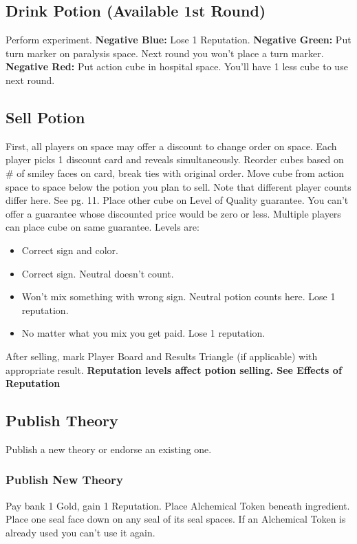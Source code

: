 \documentclass[12pt]{article}
\newenvironment{itemizeCustom}
{\begin{itemize}
  \setlength{\itemsep}{1pt}
  \setlength{\parskip}{0pt}
  \setlength{\parsep}{0pt}}
{\end{itemize}}
\begin{document}
\begin{multicols*}{2}
\subsection*{Drink Potion (Available 1st Round)}
Perform experiment. \textbf{Negative Blue:} Lose 1 Reputation. \textbf{Negative Green:} Put turn marker on paralysis space. Next round you won't place a turn marker. \textbf{Negative Red:} Put action cube in hospital space. You'll have 1 less cube to use next round.

\subsection*{Sell Potion}
First, all players on space may offer a discount to change order on space. Each player picks 1 discount card and reveals simultaneously. Reorder cubes based on \# of smiley faces on card, break ties with original order. Move cube from action space to space below the potion you plan to sell. Note that different player counts differ here. See pg. 11. Place other cube on Level of Quality guarantee. You can't offer a guarantee whose discounted price would be zero or less. Multiple players can place cube on same guarantee. Levels are:

\begin{itemizeCustom}
    \item Correct sign and color.
    \item Correct sign. Neutral doesn't count.
    \item Won't mix something with wrong sign. Neutral potion counts here. Lose 1 reputation.
    \item No matter what you mix you get paid. Lose 1 reputation.

\end{itemizeCustom}

After selling, mark Player Board and Results Triangle (if applicable) with appropriate result. \textbf{Reputation levels affect potion selling. See Effects of Reputation}

\subsection*{Publish Theory}
Publish a new theory or endorse an existing one.

\subsubsection*{Publish New Theory} Pay bank 1 Gold, gain 1 Reputation. Place Alchemical Token beneath ingredient. Place one seal face down on any seal of its seal spaces. If an Alchemical Token is already used you can't use it again.


\end{multicols*}
\end{document}
